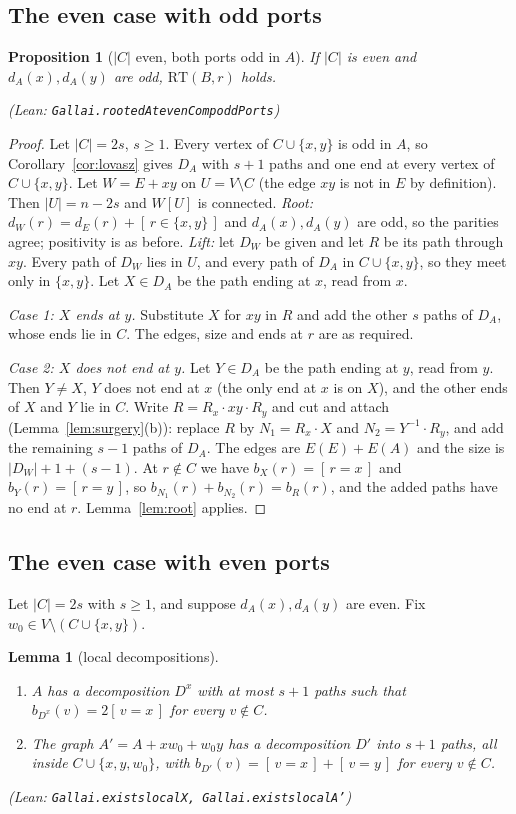 \documentclass[11pt]{amsart}
\newtheorem{lemma}[theorem]{Lemma}
\newtheorem{proposition}[theorem]{Proposition}
\theoremstyle{definition}
\theoremstyle{remark}
\renewcommand{\_}{\oldunderscore\allowbreak}
\newcommand{\leanst}[1]{\par{\raggedright\small\textup{(Lean: \texttt{#1})}\par}}
\newcommand{\RT}{\mathrm{RT}}
\newcommand{\ind}[1]{[\,#1\,]}
\begin{document}
\subsection{The even case with odd ports}

\begin{proposition}[$|C|$ even, both ports odd in $A$]\label{prop:evenodd}
If $|C|$ is even and $d_A(x),d_A(y)$ are odd, $\RT(B,r)$ holds.
\leanst{Gallai.rootedAt\_evenComp\_oddPorts}
\end{proposition}

\begin{proof}
Let $|C|=2s$, $s\ge1$. Every vertex of $C\cup\{x,y\}$ is odd in $A$, so Corollary~\ref{cor:lovasz}
gives $D_A$ with $s+1$ paths and one end at every vertex of $C\cup\{x,y\}$. Let $W=E+xy$ on
$U=V\setminus C$ (the edge $xy$ is not in $E$ by definition). Then $|U|=n-2s$ and $W[U]$ is connected.
\emph{Root:} $d_W(r)=d_E(r)+\ind{r\in\{x,y\}}$ and $d_A(x),d_A(y)$ are odd, so the parities agree;
positivity is as before. \emph{Lift:} let $D_W$ be given and let $R$ be its path through $xy$. Every
path of $D_W$ lies in $U$, and every path of $D_A$ in $C\cup\{x,y\}$, so they meet only in
$\{x,y\}$. Let $X\in D_A$ be the path ending at $x$, read from $x$.

\emph{Case 1: $X$ ends at $y$.} Substitute $X$ for $xy$ in $R$ and add the other $s$ paths of $D_A$,
whose ends lie in $C$. The edges, size and ends at $r$ are as required.

\emph{Case 2: $X$ does not end at $y$.} Let $Y\in D_A$ be the path ending at $y$, read from $y$. Then
$Y\ne X$, $Y$ does not end at $x$ (the only end at $x$ is on $X$), and the other ends of $X$ and $Y$
lie in $C$. Write $R=R_x\cdot xy\cdot R_y$ and cut and attach (Lemma~\ref{lem:surgery}(b)): replace
$R$ by $N_1=R_x\cdot X$ and $N_2=Y^{-1}\cdot R_y$, and add the remaining $s-1$ paths of $D_A$. The
edges are $E(E)+E(A)$ and the size is $|D_W|+1+(s-1)$. At $r\notin C$ we have
$b_X(r)=\ind{r=x}$ and $b_Y(r)=\ind{r=y}$, so
$b_{N_1}(r)+b_{N_2}(r)=b_R(r)$, and the added paths have no end at $r$. Lemma~\ref{lem:root}
applies.
\end{proof}

\subsection{The even case with even ports}
Let $|C|=2s$ with $s\ge1$, and suppose $d_A(x),d_A(y)$ are even. Fix
$w_0\in V\setminus(C\cup\{x,y\})$.

\begin{lemma}[local decompositions]\label{lem:local}
\begin{enumerate}[label=\textup{(\alph*)}]
\item $A$ has a decomposition $D^x$ with at most $s+1$ paths such that $b_{D^x}(v)=2\ind{v=x}$ for
every $v\notin C$.
\item The graph $A'=A+xw_0+w_0y$ has a decomposition $D'$ into $s+1$ paths, all inside
$C\cup\{x,y,w_0\}$, with $b_{D'}(v)=\ind{v=x}+\ind{v=y}$ for every $v\notin C$.
\end{enumerate}
\leanst{Gallai.exists\_localX, Gallai.exists\_localA'}
\end{lemma}
\end{document}
